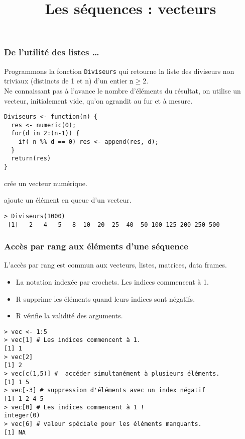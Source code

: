 \documentclass[10pt]{beamer}
\title{Les séquences : vecteurs}
\begin{document}
\maketitle




\begin{frame}[fragile]
  \frametitle{De l’utilité des listes \dots}
  Programmons la fonction \texttt{Diviseurs} qui retourne la liste des diviseurs non triviaux (distincts de 1 et n) d'un entier $\mathtt{n} \geq 2$. \\
  Ne connaissant pas à l'avance le nombre d'éléments du résultat, on utilise un vecteur, initialement vide, qu'on agrandit au fur et à mesure.
  \begin{lstlisting}[style=editor]
Diviseurs <- function(n) {
  res <- numeric(0);
  for(d in 2:(n-1)) {
    if( n %% d == 0) res <- append(res, d);
  }
  return(res)
}    
\end{lstlisting}

\begin{description}
\item[\texttt{numeric}] crée un vecteur numérique. 
\item[\texttt{append}] ajoute un élément en queue d'un vecteur.
\end{description}
\begin{lstlisting}
> Diviseurs(1000)
 [1]   2   4   5   8  10  20  25  40  50 100 125 200 250 500  
\end{lstlisting}
\end{frame}

\begin{frame}[fragile]
  \frametitle{Accès par rang aux éléments d'une séquence}
  L'accès par rang est commun aux vecteurs, listes, matrices, data frames.\\
  \begin{itemize}
  \item \alert{La notation indexée par crochets. Les indices commencent à 1.}
  \item R supprime les éléments quand leurs indices sont négatifs.
  \item R vérifie la validité des arguments.
  \end{itemize}

  
  \begin{lstlisting}
> vec <- 1:5
> vec[1] # Les indices commencent à 1.
[1] 1
> vec[2]
[1] 2
> vec[c(1,5)] #  accéder simultanément à plusieurs éléments.
[1] 1 5
> vec[-3] # suppression d'éléments avec un index négatif
[1] 1 2 4 5
> vec[0] # Les indices commencent à 1 !
integer(0)
> vec[6] # valeur spéciale pour les éléments manquants.
[1] NA   
\end{lstlisting}
\end{frame}
\end{document}
